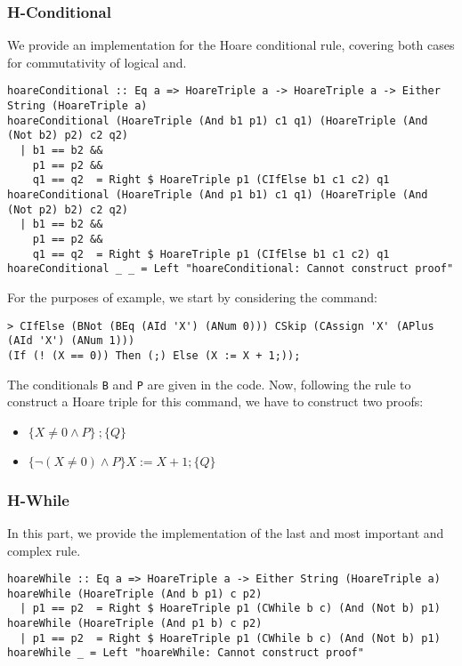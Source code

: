 \documentclass{article}
\begin{document}
\subsubsection{H-Conditional}

We provide an implementation for the Hoare conditional rule, covering both cases for commutativity of logical and.

\begin{lstlisting}
hoareConditional :: Eq a => HoareTriple a -> HoareTriple a -> Either String (HoareTriple a)
hoareConditional (HoareTriple (And b1 p1) c1 q1) (HoareTriple (And (Not b2) p2) c2 q2)
  | b1 == b2 &&
    p1 == p2 &&
    q1 == q2  = Right $ HoareTriple p1 (CIfElse b1 c1 c2) q1
hoareConditional (HoareTriple (And p1 b1) c1 q1) (HoareTriple (And (Not p2) b2) c2 q2)
  | b1 == b2 &&
    p1 == p2 &&
    q1 == q2  = Right $ HoareTriple p1 (CIfElse b1 c1 c2) q1
hoareConditional _ _ = Left "hoareConditional: Cannot construct proof"
\end{lstlisting}

For the purposes of example, we start by considering the command:

\begin{lstlisting}
> CIfElse (BNot (BEq (AId 'X') (ANum 0))) CSkip (CAssign 'X' (APlus (AId 'X') (ANum 1)))
(If (! (X == 0)) Then (;) Else (X := X + 1;));
\end{lstlisting}

The conditionals \texttt{B} and \texttt{P} are given in the code. Now, following the rule to construct a Hoare triple for this command, we have to construct two proofs:

\begin{itemize}
\item $\{X \neq 0 \land P\} \ ; \{Q\}$
\item $\{\neg(X \neq 0) \land P\} X := X + 1; \{Q\}$
\end{itemize}

\subsubsection{H-While}

In this part, we provide the implementation of the last and most important and complex rule.

\begin{lstlisting}
hoareWhile :: Eq a => HoareTriple a -> Either String (HoareTriple a)
hoareWhile (HoareTriple (And b p1) c p2)
  | p1 == p2  = Right $ HoareTriple p1 (CWhile b c) (And (Not b) p1)
hoareWhile (HoareTriple (And p1 b) c p2)
  | p1 == p2  = Right $ HoareTriple p1 (CWhile b c) (And (Not b) p1)
hoareWhile _ = Left "hoareWhile: Cannot construct proof"
\end{lstlisting}
\end{document}
